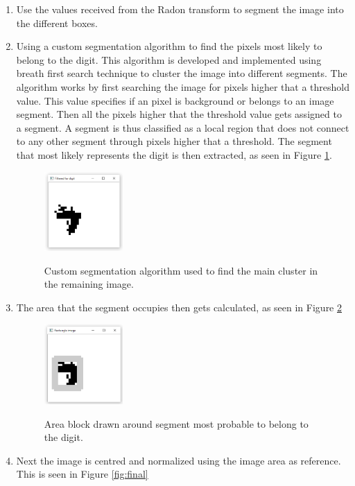 \begin{enumerate}
\item Use the values received from the Radon transform to segment the image into the different boxes.
\item Using a custom segmentation algorithm to find the pixels most likely to belong to the digit. This algorithm is developed and implemented using breath first search technique to cluster the image into different segments. The algorithm works by first searching the image for pixels higher that a threshold value. This value specifies if an pixel is background or belongs to an image segment. Then all the pixels higher that the threshold value gets assigned to a segment. A segment is thus classified as a local region that does not connect to any other segment through pixels higher that a threshold. The segment that most likely represents the digit is then extracted, as seen in Figure \ref{fig:c}.
\begin{figure}
  \centering
  \includegraphics[width=3cm]{Cluster}\\
  \caption{Custom segmentation algorithm used to find the main cluster in the remaining image.}
  \label{fig:c}
\end{figure}

\item The area that the segment occupies then gets calculated, as seen in Figure \ref{fig:areaLoc}

\begin{figure}
  \centering
  \includegraphics[width=3cm]{DetectArea}\\
  \caption{Area block drawn around segment most probable to belong to the digit.}
  \label{fig:areaLoc}
\end{figure}

\item Next the image is centred and normalized using the image area as reference. This is seen in Figure \ref{fig:final}


\end{enumerate}
